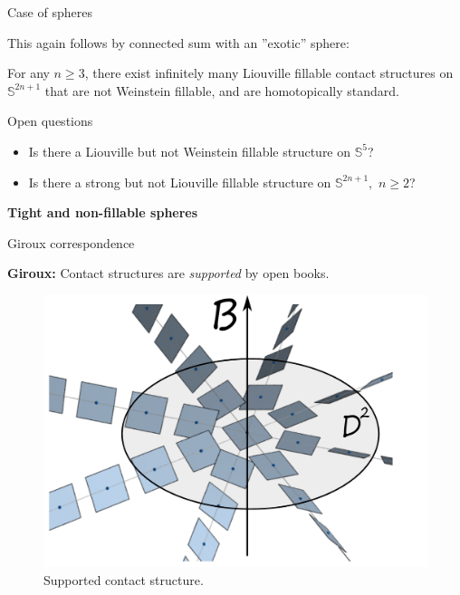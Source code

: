 \documentclass{beamer}
\begin{document}
\begin{frame}{Case of spheres}

This again follows by connected sum with an ''exotic'' sphere:

\begin{theorem}
For any $n \ge 3$, there exist infinitely many Liouville fillable contact structures on $\mathbb S^{2n+1}$ that are not Weinstein fillable, and are homotopically standard.
\end{theorem}
    
\end{frame}

\begin{frame}

\begin{exampleblock}{Open questions}
\begin{itemize}
    \item Is there a Liouville but not Weinstein fillable structure on $\mathbb S^5$?
    \item Is there a strong but not Liouville fillable structure on $\mathbb S^{2n+1},$ $n\geq 2$?
\end{itemize}

\end{exampleblock}
 
\end{frame}

\begin{frame}
\begin{tcolorbox}
\Huge \begin{center}
    \textbf{Tight and non-fillable spheres}
\end{center}
\end{tcolorbox}
\end{frame}

\begin{frame}{Giroux correspondence}

\begin{tcolorbox}
\textbf{Giroux:} Contact structures are \emph{supported} by open books.
\end{tcolorbox} 

\begin{figure}
    \centering
    \includegraphics[width=0.6\linewidth]{standardctct.pdf}
    \caption{Supported contact structure.}
    \label{fig:adapted}
\end{figure}

\end{frame}
\end{document}
